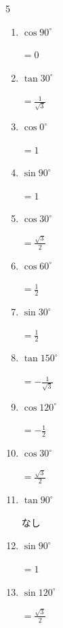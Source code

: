 \begin{multicols}{5}
\begin{enumerate}
  \item $\displaystyle \cos{90^\circ}$

        $\displaystyle =0$

  \item $\displaystyle \tan{30^\circ}$

        $\displaystyle =\frac{1}{\sqrt{3}}$

  \item $\displaystyle \cos{0^\circ}$

        $\displaystyle =1$

  \item $\displaystyle \sin{90^\circ}$

        $\displaystyle =1$

  \item $\displaystyle \cos{30^\circ}$

        $\displaystyle =\frac{\sqrt{3}}{2}$

  \item $\displaystyle \cos{60^\circ}$

        $\displaystyle =\frac{1}{2}$

\columnbreak %

  \item $\displaystyle \sin{30^\circ}$

        $\displaystyle =\frac{1}{2}$

  \item $\displaystyle \tan{150^\circ}$

        $\displaystyle =-\frac{1}{\sqrt{3}}$

  \item $\displaystyle \cos{120^\circ}$

        $\displaystyle =-\frac{1}{2}$

  \item $\displaystyle \cos{30^\circ}$

        $\displaystyle =\frac{\sqrt{3}}{2}$

  \item $\displaystyle \tan{90^\circ}$

        $\displaystyle なし$

  \item $\displaystyle \sin{90^\circ}$

        $\displaystyle =1$

  \item $\displaystyle \sin{120^\circ}$

        $\displaystyle =\frac{\sqrt{3}}{2}$


\end{enumerate}
\end{multicols}
